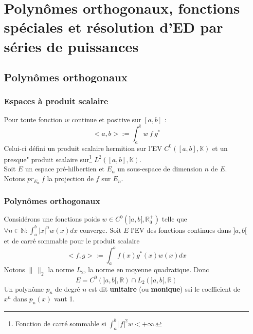 \chapter{Polynômes orthogonaux, fonctions spéciales et résolution d'ED 
par séries de puissances}

\setcounter{section}{16}
\section{Polynômes orthogonaux}
\setcounter{subsection}{1}
\subsection{Espaces à produit scalaire}
Pour toute fonction $w$ continue et positive sur $[a,b]$ :
\begin{equation}
	<a,b> := \int_a^b w\ f\ g^*
\end{equation}
Celui-ci défini un produit scalaire hermition sur l'EV $C^0([a,b], 
\mathbb{K})$ et un presque" produit scalaire sur\footnote{Fonction de 
	carré sommable si $\int_a^b |f|^2 w < +\infty$.} $L^2([a,b],\mathbb{
	K})$.\\
	
Soit $E$ un espace pré-hilbertien et $E_n$ un sous-espace de dimension 
$n$ de $E$. Notons $pr_{E_n}\ f$ la projection de $f$ sur $E_n$.

	
	
\subsection{Polynômes orthogonaux}
Considérons une fonctions poids $w \in C^0(]a,b[,\mathbb{R}_0^+)$ 
telle que $\forall n \in \mathbb{N} : \int_a^b |x|^n w(x)dx$ converge. 
Soit $E$ l'EV des fonctions continues dans $]a,b[$ et de carré sommable 
pour le produit scalaire
\begin{equation}
	<f,g> := \int_a^b f(x)g^*(x)w(x)dx
\end{equation}
Notons $\|\ \|_2$ la norme $L_2$, la norme en moyenne quadratique. Donc 
\begin{equation}
	E = C^0(]a,b[,\mathbb{R})\cap L_2(]a,b[, \mathbb{R})
\end{equation}
Un polynôme $p_n$ de degré $n$ est dit \textbf{unitaire} (ou \textbf{
	monique}) ssi le coefficient de $x^n$ dans $p_n(x)$ vaut 1.\\
	
